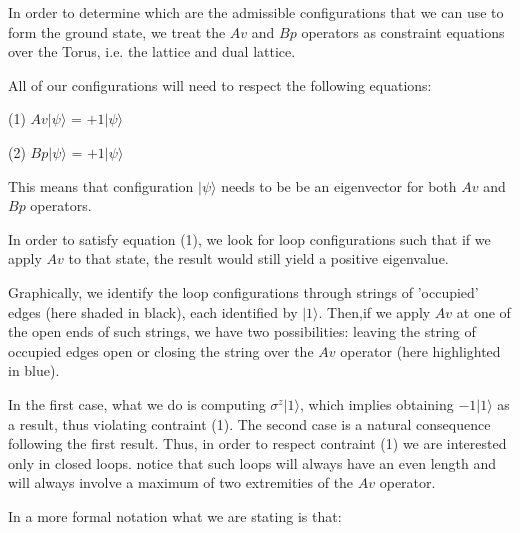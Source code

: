 \documentclass[12pt]{report}
\begin{document}
\begin{minipage}{1\textwidth}
	
	In order to determine which are the admissible configurations that we can use to form the ground state, we treat the $Av$ and $Bp$ operators as constraint equations over the Torus, i.e. the lattice and dual lattice.\newline
	
	All of our configurations will need to respect the following equations:\newline
	
	\begin{center}
		(1)	$Av|\psi\rangle$ = $+1|\psi\rangle$
	\end{center}
	
	\begin{center}
		(2)	$Bp|\psi\rangle$ = $+1|\psi\rangle$
	\end{center}
	
	This means that configuration $|\psi\rangle$ needs to be be an eigenvector for both $Av$ and $Bp$ operators. \newline
	
	In order to satisfy equation (1), we look for loop configurations such that if we apply $Av$ to that state, the result would still yield a positive eigenvalue.\newline
	
	Graphically, we identify the loop configurations through strings of 'occupied' edges (here shaded in black), each identified by $|1\rangle$. Then,if we apply $Av$ at one of the open ends of such strings, we have two possibilities: leaving the string of occupied edges open or closing the string over the $Av$ operator (here highlighted in blue).\newline
	
	
	In the first case, what we do is computing $\sigma^{z} |1\rangle$, which implies obtaining $-1|1\rangle$ as a result, thus violating contraint (1). The second case is a natural consequence following the first result. Thus, in order to respect contraint (1) we are interested only in closed loops. notice that such loops will always have an even length and will always involve a maximum of two extremities of the $Av$ operator.\newline
	
	In a more formal notation what we are stating is that:\newline
	

\end{minipage}
\end{document}

